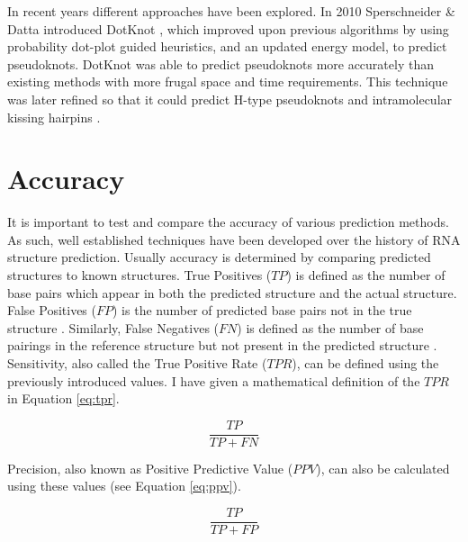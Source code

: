 \documentclass{cshonours}
\begin{document}
In recent years different approaches have been explored. In 2010 Sperschneider \& Datta introduced DotKnot \cite{sperschneider2010dotknot}, which improved upon previous algorithms by using probability dot-plot guided heuristics, and an updated energy model, to predict pseudoknots. DotKnot was able to predict pseudoknots more accurately than existing methods with more frugal space and time requirements. This technique was later refined so that it could predict H-type pseudoknots and intramolecular kissing hairpins \cite{sperschneider2011heuristic}.


\section{Accuracy}
\label{sec:accuracy}
It is important to test and compare the accuracy of various prediction methods.
As such, well established techniques have been developed over
the history of RNA structure prediction. Usually accuracy is determined by comparing predicted structures to known
structures. True Positives ($TP$) is defined as the number of base pairs which appear in both the predicted structure and the actual structure. False Positives
($FP$) is the number of predicted base pairs not in the true
structure \cite{lorenz2011viennarna}. Similarly, False Negatives ($FN$) is defined as the number of base
pairings in the reference structure but not present in the predicted structure \cite{lorenz2011viennarna}.
Sensitivity, also called the True Positive Rate ($TPR$), can be defined using the previously introduced values. I have given a mathematical definition of the $TPR$ in Equation \ref{eq:tpr}.

\begin{equation} \label{eq:tpr}
 \frac{TP}{TP + FN}
\end{equation}

Precision, also known as Positive Predictive Value ($PPV$), can also be calculated
using these values (see Equation \ref{eq:ppv}).


\begin{equation} \label{eq:ppv}
 \frac{TP}{TP + FP}
\end{equation}
\end{document}
